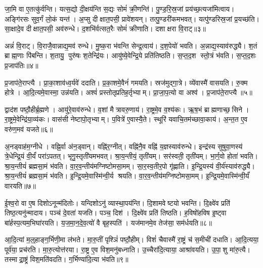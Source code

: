 जा॒मि वा ए॒तत्कु॑र्वन्ति।
यत्स॒द्यो दी॒क्षय॑न्ति स॒द्यः सोमं॑ क्री॒णन्ति॑।
पु॒ण्ड॒रि॒स्र॒जां प्रय॑च्छ॒त्यजा॑मित्वाय।
अङ्गि॑रसः सुव॒र्गं लो॒कं यन्त॑।
अ॒प्सु दीक्षात॒पसी॒ प्रावे॑शयन्।
तत्पु॒ण्डरी॑कमभवत्।
यत्पु॑ण्डरिस्र॒जां प्र॒यच्छ॑ति।
सा॒क्षादे॒व दीक्षात॒पसी॒ अव॑रुन्धे।
द॒शभि॑र्वत्सत॒रैः सोमं॑ क्रीणाति।
दशाक्षरा वि॒राट्॥३॥

अन्नं॑ वि॒राट्।
वि॒राजै॒वान्नाद्य॒मव॑ रुन्धे।
मु॒ष्क॒रा भ॑वन्ति सेन्द्र॒त्वाय॑।
द॒श॒पेयो॑ भवति।
अ॒न्नाद्य॒स्याव॑रुद्ध्यै।
श॒तं ब्राह्म॒णाः पि॑बन्ति।
श॒तायु॒ पुरु॑षः श॒तेन्द्रि॑यः।
आयु॑ष्ये॒वेन्द्रि॒ये प्रति॑तिष्ठति।
स॒प्त॒द॒श स्तो॒त्रं भ॑वति।
स॒प्त॒द॒शः प्र॒जाप॑तिः॥४॥

प्र॒जाप॑ते॒राप्त्यै।
प्रा॒का॒शाव॑ध्व॒र्यवे॑ ददाति।
प्र॒का॒शमे॒वैनं॑ गमयति।
स्रज॑मुद्गा॒त्रे।
व्ये॑वास्मै॑ वासयति।
रु॒क्म होत्रे।
आ॒दि॒त्यमे॒वास्मा॒ उन्न॑यति।
अश्वं॑ प्रस्तोतृप्रतिह॒र्तृभ्याम्।
प्रा॒जा॒प॒त्यो वा अश्व॑।
प्र॒जाप॑ते॒राप्त्यै॥५॥

द्वाद॑श पष्ठौ॒हीर्ब्र॒ह्मणे।
आयु॑रे॒वाव॑रुन्धे।
व॒शां मैत्रावरु॒णाय॑।
रा॒ष्ट्रमे॒व व॒श्य॑कः।
ऋ॒ष॒भं ब्राह्मणाच्छ॒सिने।
रा॒ष्ट्रमे॒वेन्द्रि॑या॒\-व्य॑कः।
वास॑सी नेष्टापो॒तृभ्याम्।
प॒वित्रे॑ ए॒वास्यै॒ते।
स्थूरि॑ यवाचि॒तम॑च्छावा॒काय॑।
अ॒न्त॒त ए॒व वरु॑ण॒मव॑ यजते॥६॥

अ॒नड्वाह॑म॒ग्नीधे।
वह्नि॒र्वा अ॑न॒ड्वान्।
वह्नि॑र॒ग्नीत्।
वह्नि॑नै॒व वह्नि॑ य॒ज्ञस्याव॑रुन्धे।
इन्द्र॑स्य सुषुवा॒णस्य॑ त्रे॒धेन्द्रि॒यं वी॒र्यं॑ परा॑ऽपतत्।
भृगु॒स्तृती॑यमभवत्।
श्रा॒य॒न्तीयं॒ तृती॑यम्।
सर॑स्वती॒ तृती॑यम्।
भा॒र्ग॒वो होता॑ भवति।
श्रा॒य॒न्तीयं॑ ब्रह्मसा॒मं भ॑वति।
वा॒र॒व॒न्तीय॑मग्निष्टोमसा॒मम्।
सा॒र॒स्व॒तीर॒पो गृ॑ह्णाति।
इ॒न्द्रि॒यस्य॑ वी॒र्य॑स्याव॑रुद्ध्यै।
श्रा॒य॒न्तीयं॑ ब्रह्मसा॒मं भ॑वति।
इ॒न्द्रि॒यमे॒वास्मि॑न्वी॒र्य श्रयति।
वा॒र॒व॒न्तीय॑मग्निष्टोमसा॒मम्।
इ॒न्द्रि॒यमे॒वास्मि॑न्वी॒र्यं॑ वारयति॥७॥\anuvakamend[वि॒राट्प्र॒जाप॑ति॒रश्व॑ प्र॒जाप॑ते॒राप्त्यै॑ यजते ब्रह्मसा॒मं भ॑वति स॒प्त च॑]

ई॒श्व॒रो वा ए॒ष दिशोऽनून्म॑दितोः।
यन्दिशोऽनु॑ व्यास्था॒पय॑न्ति।
दि॒शामवेष्टयो भवन्ति।
दि॒क्ष्वे॑व प्रति॑ तिष्ठ॒त्यनु॑न्मादाय।
पञ्च॑ दे॒वता॑ यजति।
पञ्च॒ दिश॑।
दि॒क्ष्वे॑व प्रति॑ तिष्ठति।
ह॒विषो॑हविष इ॒ष्ट्वा बा॑र्\mbox{}हस्प॒त्यम॒भिघा॑रयति।
य॒ज॒मा॒न॒दे॒व॒त्यो॑ वै बृह॒स्पति॑।
यज॑मानमे॒व तेज॑सा॒ सम॑र्धयति॥८॥

आ॒दि॒त्यां म॒ल्॒हाङ्ग॒र्भिणी॒मा ल॑भते।
मा॒रु॒तीं पृश्ञिं॑ पष्ठौ॒हीम्।
विशं॑ चैवास्मै॑ रा॒ष्ट्रं च॑ स॒मीची॑ दधाति।
आ॒दि॒त्यया॒ पूर्व॑या॒ प्रच॑रति।
मा॒रु॒त्योत्त॑रया।
रा॒ष्ट्र ए॒व विश॒मनु॑बध्नाति।
उ॒च्चैरा॑दि॒त्याया॒ आश्रा॑वयति।
उ॒पा॒शु मा॑रु॒त्यै।
तस्माद्रा॒ष्ट्रं विश॒मति॑वदति।
ग॒र्भिण्या॑दि॒त्या भ॑वति॥९॥

